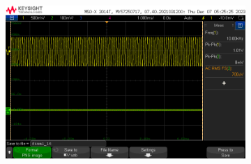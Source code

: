 \documentclass[notitlepage, 12pt]{report}
\begin{document}
\begin{enumerate}
\begin{figure}
\begin{subfigure}{0.3\textwidth}
            \includegraphics[scale=0.2]{images/minvolhigh.png}
        \end{subfigure}    
    

\end{figure}
\end{enumerate}
\end{document}

